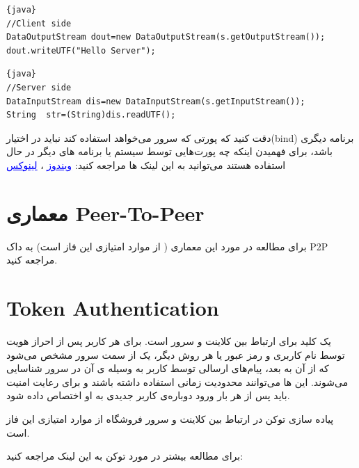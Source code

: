 \documentclass[]{article}
\begin{document}
\begin{enumerate}
\begin{latin}
\begin{lstlisting}{java}
//Client side
DataOutputStream dout=new DataOutputStream(s.getOutputStream());  dout.writeUTF("Hello Server");  			
\end{lstlisting}

\end{latin}

\begin{latin}

\begin{lstlisting}{java}
//Server side
DataInputStream dis=new DataInputStream(s.getInputStream());
String  str=(String)dis.readUTF();  

\end{lstlisting}

\end{latin}



\end{enumerate}

دقت کنید که پورتی که سرور می‌خواهد استفاده کند نباید در اختیار(bind) برنامه دیگری باشد، برای فهمیدن اینکه چه پورت‌هایی توسط سیستم یا برنامه های دیگر در حال استفاده هستند می‌توانید به این لینک ها مراجعه کنید:
\href{https://www.howtogeek.com/howto/28609/how-can-i-tell-what-is-listening-on-a-tcpip-port-in-windows/}{\textcolor{blue}{\underline{{ ویندوز}}}}
  ،
   \href{https://www.cyberciti.biz/faq/unix-linux-check-if-port-is-in-use-command/}{\textcolor{blue}{\underline{{لینوکس}}}}


\section*{{\titr معماری Peer-To-Peer}}

برای مطالعه در مورد این معماری ( از موارد امتیازی این فاز است) به داک P2P مراجعه کنید.


\section*{{\titr Token Authentication }}

 یک کلید برای ارتباط بین کلاینت و سرور است. برای هر کاربر پس از احراز هویت توسط نام کاربری و رمز عبور یا هر روش دیگر، یک   از سمت سرور مشخص می‌شود که از آن به بعد، پیام‌های ارسالی توسط کاربر به وسیله ی آن  در سرور شناسایی می‌شوند. این  ها می‌توانند محدودیت زمانی استفاده داشته باشند و برای رعایت امنیت باید پس از هر بار ورود دوباره‌ی کاربر  جدیدی به او اختصاص داده شود.

پیاده سازی توکن در ارتباط بین کلاینت و سرور فروشگاه از موارد امتیازی این فاز است.

برای مطالعه بیشتر در مورد توکن به این لینک مراجعه کنید:


\begin{center}
\href{https://scotch.io/tutorials/the-ins-and-outs-of-token-based-authentication}{\textcolor{blue}{\underline{}}}

\end{center}
\end{document}
